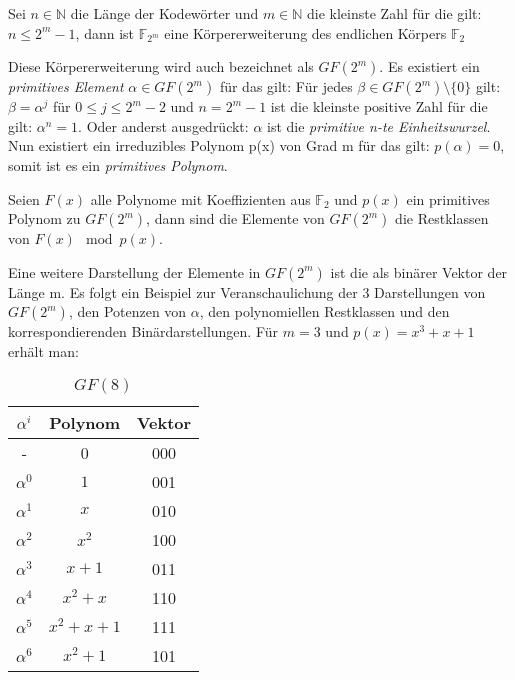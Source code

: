 \begin{t_def}
Sei $n \in \mathbb{N}$ die Länge der Kodewörter und $m \in \mathbb{N}$ die kleinste Zahl für die gilt: $n \leq 2^m -1$, dann ist $\mathbb{F}_{2^m}$ eine Körpererweiterung des endlichen Körpers $\mathbb{F}_{2}$
\end{t_def}

Diese Körpererweiterung wird auch bezeichnet als $GF(2^m)$. 
Es existiert ein \textit{primitives Element} $\alpha \in GF(2^m)$ für das gilt: Für jedes $\beta \in GF(2^m)\setminus\{0\}$ gilt: $\beta = \alpha^j$ für $0 \leq j \leq 2^m -2$ und $n = 2^m-1$ ist die kleinste positive Zahl für die gilt: $\alpha^n = 1$. Oder anderst ausgedrückt: $\alpha$ ist die {\em primitive n-te Einheitswurzel}.\cite[Kap. 3.2.1]{morelos2006art}
Nun existiert ein irreduzibles Polynom p(x) von Grad m für das gilt: $p(\alpha) = 0$, somit ist es ein {\em primitives Polynom}.

\begin{t_def}
Seien $F(x)$ alle Polynome mit Koeffizienten aus $\mathbb{F}_2$ und $p(x)$ ein primitives Polynom zu $GF(2^m)$, dann sind die Elemente von $GF(2^m)$ die Restklassen von $F(x) \mod p(x)$.  \cite[Kap. 5.2]{bose2008infotheory}
\end{t_def}

Eine weitere Darstellung der Elemente in $GF(2^m)$ ist die als binärer Vektor der Länge m. Es folgt ein Beispiel zur Veranschaulichung der 3 Darstellungen von $GF(2^m)$, den Potenzen von $\alpha$, den polynomiellen Restklassen und den korrespondierenden Binärdarstellungen. Für $m=3$ und $p(x) = x^3 + x + 1$ erhält man:


\begin{table}[!h]
\begin{center}
\begin{tabular}{c|c|c}
$\alpha^i$ & Polynom & Vektor \\
\hline
- & 0 & 000 \\
$\alpha^0$ & $1$ & 001 \\
$\alpha^1$ & $x$ & 010 \\
$\alpha^2$ & $x^2$ & 100 \\
$\alpha^3$ & $x+1$ & 011 \\
$\alpha^4$ & $x^2+x$ & 110 \\
$\alpha^5$ & $x^2+x+1$ & 111 \\
$\alpha^6$ & $x^2+1$ & 101 \\
\end{tabular}
\caption{$GF(8)$}
\label{table:gf}
\end{center}
\end{table}




